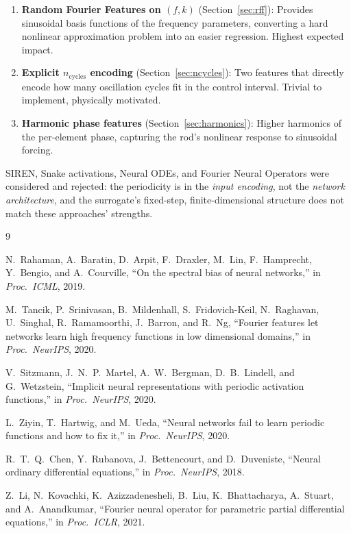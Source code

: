\documentclass[11pt]{article}
\begin{document}
\begin{enumerate}
  \item \textbf{Random Fourier Features on $(f, k)$} (Section~\ref{sec:rff}):
    Provides sinusoidal basis functions of the frequency parameters, converting
    a hard nonlinear approximation problem into an easier regression.
    Highest expected impact.

  \item \textbf{Explicit $n_{\mathrm{cycles}}$ encoding} (Section~\ref{sec:ncycles}):
    Two features that directly encode how many oscillation cycles fit in the
    control interval. Trivial to implement, physically motivated.

  \item \textbf{Harmonic phase features} (Section~\ref{sec:harmonics}):
    Higher harmonics of the per-element phase, capturing the rod's nonlinear
    response to sinusoidal forcing.
\end{enumerate}

\noindent
SIREN, Snake activations, Neural ODEs, and Fourier Neural Operators were
considered and rejected: the periodicity is in the \emph{input encoding}, not
the \emph{network architecture}, and the surrogate's fixed-step,
finite-dimensional structure does not match these approaches' strengths.


\begin{thebibliography}{9}

N.~Rahaman, A.~Baratin, D.~Arpit, F.~Draxler, M.~Lin, F.~Hamprecht,
Y.~Bengio, and A.~Courville,
``On the spectral bias of neural networks,''
in \textit{Proc.\ ICML}, 2019.

M.~Tancik, P.~Srinivasan, B.~Mildenhall, S.~Fridovich-Keil, N.~Raghavan,
U.~Singhal, R.~Ramamoorthi, J.~Barron, and R.~Ng,
``Fourier features let networks learn high frequency functions in low
dimensional domains,''
in \textit{Proc.\ NeurIPS}, 2020.

V.~Sitzmann, J.~N.~P.~Martel, A.~W.~Bergman, D.~B.~Lindell, and G.~Wetzstein,
``Implicit neural representations with periodic activation functions,''
in \textit{Proc.\ NeurIPS}, 2020.

L.~Ziyin, T.~Hartwig, and M.~Ueda,
``Neural networks fail to learn periodic functions and how to fix it,''
in \textit{Proc.\ NeurIPS}, 2020.

R.~T.~Q.~Chen, Y.~Rubanova, J.~Bettencourt, and D.~Duveniste,
``Neural ordinary differential equations,''
in \textit{Proc.\ NeurIPS}, 2018.

Z.~Li, N.~Kovachki, K.~Azizzadenesheli, B.~Liu, K.~Bhattacharya,
A.~Stuart, and A.~Anandkumar,
``Fourier neural operator for parametric partial differential equations,''
in \textit{Proc.\ ICLR}, 2021.

\end{thebibliography}
\end{document}
